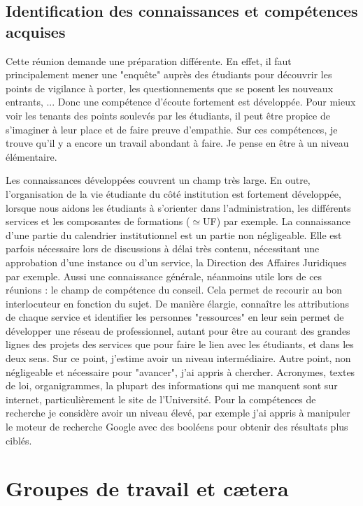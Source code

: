 \documentclass{article}
\begin{document}
\subsection{Identification des connaissances et compétences acquises}
Cette réunion demande une préparation différente. 
En effet, il faut principalement mener une "enquête" auprès des étudiants pour découvrir les points de vigilance à porter, les questionnements que se posent les nouveaux entrants, ... 
Donc une compétence d'écoute fortement est développée. 
Pour mieux voir les tenants des points soulevés par les étudiants, il peut être propice de s'imaginer à leur place et de faire preuve d'empathie. 
Sur ces compétences, je trouve qu'il y a encore un travail abondant à faire. 
Je pense en être à un niveau élémentaire. \par 
Les connaissances développées couvrent un champ très large. 
En outre, l'organisation de la vie étudiante du côté institution est fortement développée, lorsque nous aidons les étudiants à s'orienter dans l'administration, les différents services et les composantes de formations ($\simeq$UF) par exemple. 
La connaissance d'une partie du calendrier institutionnel est un partie non négligeable. 
Elle est parfois nécessaire lors de discussions à délai très contenu, nécessitant une approbation d'une instance ou d'un service, la Direction des Affaires Juridiques par exemple.
Aussi une connaissance générale, néanmoins utile lors de ces réunions : le champ de compétence du conseil. 
Cela permet de recourir au bon interlocuteur en fonction du sujet. 
De manière élargie, connaître les attributions de chaque service et identifier les personnes "ressources" en leur sein permet de développer une réseau de professionnel, autant pour être au courant des grandes lignes des projets des services que pour faire le lien avec les étudiants, et dans les deux sens. Sur ce point, j'estime avoir un niveau intermédiaire.
Autre point, non négligeable et nécessaire pour "avancer", j'ai appris à chercher. 
Acronymes, textes de loi, organigrammes, la plupart des informations qui me manquent sont sur internet, particulièrement le site de l'Université. 
Pour la compétences de recherche je considère avoir un niveau élevé, par exemple j'ai appris à manipuler le moteur de recherche Google avec des booléens pour obtenir des résultats plus ciblés.

\newpage

\section{Groupes de travail et cætera}
\end{document}

